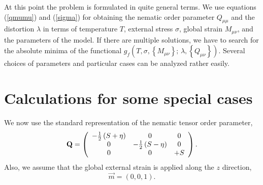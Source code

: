 \documentclass[aps,pre,reprint,amsmath,amssymbols,superscriptaddress,
nofootinbib]{revtex4-1}
\begin{document}
At this point the problem is formulated in quite general terms. We use
equations (\ref{qmumu}) and (\ref{sigma}) for obtaining the nematic order
parameter $Q_{\mu\mu}$ and the distortion $\lambda$ in terms of temperature
$T$, external stress $\sigma$, global strain $M_{\mu\nu}$, and the parameters
of the model. If there are multiple solutions, we have to search for the
absolute minima of the functional $g_{f}\left(  T,\sigma,\left\{  M_{\mu\nu
}\right\}  ;\,\lambda,\left\{  Q_{\mu\nu}\right\}  \right)  $. Several choices
of parameters and particular cases can be analyzed rather easily.

\section{Calculations for some special cases}

We now use the standard representation of the nematic tensor order parameter,%
\begin{equation}
\mathbf{Q}=\left(
\begin{array}
[c]{ccc}%
-\frac{1}{2}\left(  S+\eta\right)  & 0 & 0\\
0 & -\frac{1}{2}\left(  S-\eta\right)  & 0\\
0 & 0 & +S
\end{array}
\right)  .\label{Q}%
\end{equation}
Also, we assume that the global external strain is applied along the $z$
direction,%
\begin{equation}
\overrightarrow{m}=\left(  0,0,1\right)  .
\end{equation}
\end{document}
